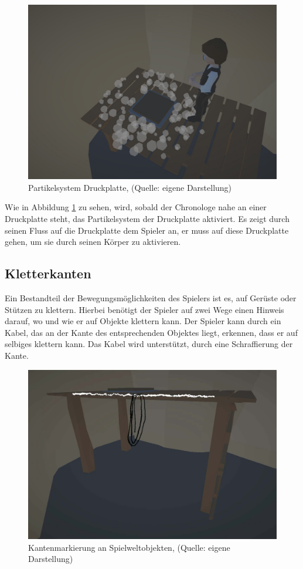 \begin{figure}[ht]
\centering
\includegraphics[width=0.8\linewidth]{content/pictures/Pressureplate_tooltip.jpg}
\caption{Partikelsystem Druckplatte, (Quelle: eigene Darstellung)}
\label{fig:pressureplate_tooltip}
\end{figure}

Wie in Abbildung \ref{fig:pressureplate_tooltip} zu sehen, wird, sobald der Chronologe nahe an einer Druckplatte steht, das Partikelsystem der Druckplatte aktiviert. Es zeigt durch seinen Fluss auf die Druckplatte dem Spieler an, er muss auf diese Druckplatte gehen, um sie durch seinen Körper zu aktivieren.

\subsection{Kletterkanten}\label{sec:leadge}
Ein Bestandteil der Bewegungsmöglichkeiten des Spielers ist es, auf Gerüste oder Stützen zu klettern. Hierbei benötigt der Spieler auf zwei Wege einen Hinweis darauf, wo und wie er auf Objekte klettern kann.
Der Spieler kann durch ein Kabel, das an der Kante des entsprechenden Objektes liegt, erkennen, dass er auf selbiges klettern kann. Das Kabel wird unterstützt, durch eine Schraffierung der Kante.

\begin{figure}[ht]
\centering
\includegraphics[width=0.8\linewidth]{content/pictures/leadge_wireframe.jpg}
\caption{Kantenmarkierung an Spielweltobjekten, (Quelle: eigene Darstellung)}
\label{fig:leadge}
\end{figure}

